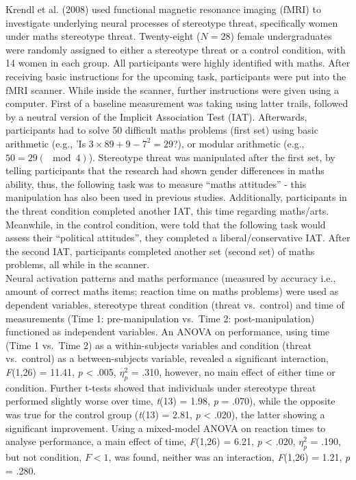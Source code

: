 \documentclass[
  stu,floatsintext]{apa7}
\begin{document}
Krendl et al. (2008) used functional magnetic resonance imaging (fMRI) to investigate underlying neural processes of stereotype threat, specifically women under maths stereotype threat.
Twenty-eight (\(N = 28\)) female undergraduates were randomly assigned to either a stereotype threat or a control condition, with 14 women in each group.
All participants were highly identified with maths.
After receiving basic instructions for the upcoming task, participants were put into the fMRI scanner.
While inside the scanner, further instructions were given using a computer.
First of a baseline measurement was taking using latter trails, followed by a neutral version of the Implicit Association Test (IAT).
Afterwards, participants had to solve 50 difficult maths problems (first set) using basic arithmetic (e.g., 'Is \(3 \times 89+9-7^2 = 29\)?), or modular arithmetic (e.g., \(50 = 29(\mod{4})\)).
Stereotype threat was manipulated after the first set, by telling participants that the research had shown gender differences in maths ability, thus, the following task was to measure ``maths attitudes'' - this manipulation has also been used in previous studies.
Additionally, participants in the threat condition completed another IAT, this time regarding maths/arts.
Meanwhile, in the control condition, were told that the following task would assess their ``political attitudes'', they completed a liberal/conservative IAT.
After the second IAT, participants completed another set (second set) of maths problems, all while in the scanner.\\
Neural activation patterns and maths performance (measured by accuracy i.e., amount of correct maths items; reaction time on maths problems) were used as dependent variables, stereotype threat condition (threat vs.~control) and time of measurements (Time 1: pre-manipulation vs.~Time 2: post-manipulation) functioned as independent variables.
An ANOVA on performance, using time (Time 1 vs.~Time 2) as a within-subjects variables and condition (threat vs.~control) as a between-subjects variable, revealed a significant interaction, \emph{F}(1,26) = 11.41, \emph{p} \textless{} .005, \(\eta^{2}_{p}\) = .310, however, no main effect of either time or condition.
Further t-tests showed that individuals under stereotype threat performed slightly worse over time, \emph{t}(13) = 1.98, \emph{p} = .070), while the opposite was true for the control group (\emph{t}(13) = 2.81, \emph{p} \textless{} .020), the latter showing a significant improvement.
Using a mixed-model ANOVA on reaction times to analyse performance, a main effect of time, \emph{F}(1,26) = 6.21, \emph{p} \textless{} .020, \(\eta^{2}_{p}\) = .190, but not condition, \(F < 1\), was found, neither was an interaction, \emph{F}(1,26) = 1.21, \emph{p} = .280.
\end{document}
